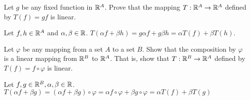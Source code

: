 \documentclass[../../main.tex]{subfiles}
\begin{document}
\begin{problem}
	Let $g$ be any fixed function in $\mathbb{R}^A$. Prove that the mapping $T:\mathbb{R}^A \to \mathbb{R}^A$ defined by $T(f) = gf$ is linear.
\end{problem}
\begin{solution}
	Let $f,h \in \mathbb{R}^A$ and $\alpha, \beta \in \mathbb{R}$. $T(\alpha f + \beta h) = g \alpha f + g \beta h = \alpha T(f) +  \beta T(h)$.
\end{solution}
\begin{problem}
	Let $\varphi$ be any mapping from a set $A$ to a set $B$. Show that the composition by $\varphi$ is a linear mapping from $\mathbb{R}^B$ to $\mathbb{R}^A$. That is, show that $T:\mathbb{R}^B \to \mathbb{R}^A$ defined by $T(f) = f \circ \varphi $ is linear.	
\end{problem}
\begin{solution}
	Let $f,g \in \mathbb{R}^B, \alpha, \beta \in \mathbb{R}$. $T(\alpha f + \beta g) = (\alpha f + \beta g) \circ \varphi = \alpha f \circ \varphi + \beta g \circ \varphi = \alpha T(f) + \beta T(g)$
\end{solution}
\end{document}
